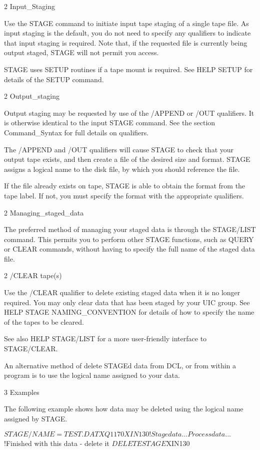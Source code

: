 \begin{XMP}
2 Input_Staging

Use the STAGE command to initiate input tape staging of a single tape file.
As input staging is the default, you do not need to specify any qualifiers
to indicate that input staging is required. Note that, if the requested
file is currently being output staged, STAGE will not permit you access.

STAGE uses SETUP routines if a tape mount is required. See HELP SETUP for
details of the SETUP command.

2 Output_staging

Output staging may be requested by use of the /APPEND or /OUT qualifiers.
It is otherwise identical to the input STAGE command.
See the section Command_Syntax for full details on qualifiers.

The /APPEND and /OUT qualifiers will cause STAGE to check that your
output tape exists, and then create a file of the desired size and format.
STAGE assigns a logical name to the disk file, by which you should reference
the file.

If the file already exists on tape, STAGE is able to obtain the format
from the tape label. If not, you must specify the format with the
appropriate qualifiers.

2 Managing_staged_data

The preferred method of managing your staged data is through the STAGE/LIST
command. This permits you to perform other STAGE functions, such as QUERY
or CLEAR commands, without having to specify the full name of the staged
data file.

2 /CLEAR tape(s)

  Use the /CLEAR qualifier to delete existing staged data when
it is no longer required. You may only clear data that has been
staged by your UIC group. See HELP STAGE NAMING_CONVENTION for
details of how to specify the name of the tapes to be cleared.

See also HELP STAGE/LIST for a more user-friendly interface to
STAGE/CLEAR.

An alternative method of delete STAGEd data from DCL, or from within
a program is to use the logical name assigned to your data.

3 Examples

The following example shows how data may be deleted using the logical
name assigned by STAGE.

$STAGE/NAME=TEST.DAT XQ1170 XIN130 ! Stage data
... Process data ...
$!Finished with this data - delete it
$DELETE STAGE$XIN130



\end{XMP}

